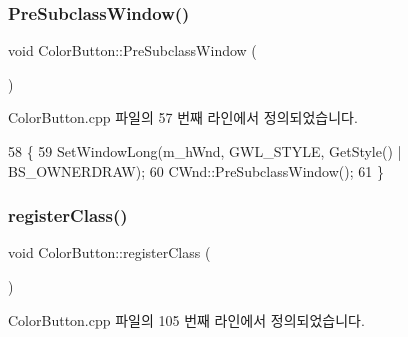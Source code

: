 \subsubsection{\texorpdfstring{Pre\+Subclass\+Window()}{PreSubclassWindow()}}
{\footnotesize\ttfamily void Color\+Button\+::\+Pre\+Subclass\+Window (\begin{DoxyParamCaption}{ }\end{DoxyParamCaption})}



Color\+Button.\+cpp 파일의 57 번째 라인에서 정의되었습니다.


\begin{DoxyCode}
58 \{
59   SetWindowLong(m\_hWnd, GWL\_STYLE, GetStyle() | BS\_OWNERDRAW);
60   CWnd::PreSubclassWindow();
61 \}
\end{DoxyCode}
\mbox{\label{class_color_button_aabbc7306d4354479e0315b2a15026571}} 
\subsubsection{\texorpdfstring{register\+Class()}{registerClass()}}
{\footnotesize\ttfamily void Color\+Button\+::register\+Class (\begin{DoxyParamCaption}{ }\end{DoxyParamCaption})}



Color\+Button.\+cpp 파일의 105 번째 라인에서 정의되었습니다.


